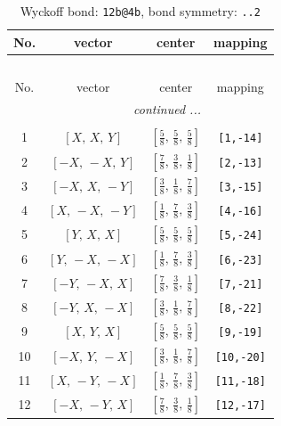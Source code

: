 \documentclass[fleqn,8pt]{jsarticle}
\begin{document}
\renewcommand{\arraystretch}{1.2}
\begin{longtable}{cccc}
\caption{Wyckoff bond: {\tt 12b@4b}, bond symmetry: {\tt ..2}}
 \\
 \hline \hline
No. & vector & center & mapping \\ \hline \endfirsthead

\multicolumn{3}{l}{\tablename\ \thetable{}} \\
 \hline \hline
No. & vector & center & mapping \\ \hline \endhead

 \hline \hline
\multicolumn{3}{r}{\footnotesize\it continued ...} \\ \endfoot

 \hline \hline
\multicolumn{3}{r}{} \\ \endlastfoot

1 & $\left[ X,\, X,\, Y \right]$ & $\left[ \frac{5}{8},\, \frac{5}{8},\, \frac{5}{8} \right]$ & {\tt [1,-14]} \\ \hline
2 & $\left[ - X,\, - X,\, Y \right]$ & $\left[ \frac{7}{8},\, \frac{3}{8},\, \frac{1}{8} \right]$ & {\tt [2,-13]} \\ \hline
3 & $\left[ - X,\, X,\, - Y \right]$ & $\left[ \frac{3}{8},\, \frac{1}{8},\, \frac{7}{8} \right]$ & {\tt [3,-15]} \\ \hline
4 & $\left[ X,\, - X,\, - Y \right]$ & $\left[ \frac{1}{8},\, \frac{7}{8},\, \frac{3}{8} \right]$ & {\tt [4,-16]} \\ \hline
5 & $\left[ Y,\, X,\, X \right]$ & $\left[ \frac{5}{8},\, \frac{5}{8},\, \frac{5}{8} \right]$ & {\tt [5,-24]} \\ \hline
6 & $\left[ Y,\, - X,\, - X \right]$ & $\left[ \frac{1}{8},\, \frac{7}{8},\, \frac{3}{8} \right]$ & {\tt [6,-23]} \\ \hline
7 & $\left[ - Y,\, - X,\, X \right]$ & $\left[ \frac{7}{8},\, \frac{3}{8},\, \frac{1}{8} \right]$ & {\tt [7,-21]} \\ \hline
8 & $\left[ - Y,\, X,\, - X \right]$ & $\left[ \frac{3}{8},\, \frac{1}{8},\, \frac{7}{8} \right]$ & {\tt [8,-22]} \\ \hline
9 & $\left[ X,\, Y,\, X \right]$ & $\left[ \frac{5}{8},\, \frac{5}{8},\, \frac{5}{8} \right]$ & {\tt [9,-19]} \\ \hline
10 & $\left[ - X,\, Y,\, - X \right]$ & $\left[ \frac{3}{8},\, \frac{1}{8},\, \frac{7}{8} \right]$ & {\tt [10,-20]} \\ \hline
11 & $\left[ X,\, - Y,\, - X \right]$ & $\left[ \frac{1}{8},\, \frac{7}{8},\, \frac{3}{8} \right]$ & {\tt [11,-18]} \\ \hline
12 & $\left[ - X,\, - Y,\, X \right]$ & $\left[ \frac{7}{8},\, \frac{3}{8},\, \frac{1}{8} \right]$ & {\tt [12,-17]} \\
\end{longtable}
\end{document}
